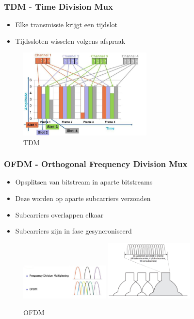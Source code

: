 \documentclass{article}
\begin{document}
\subsubsection{TDM - Time Division Mux}
\begin{itemize}
    \item Elke transmissie krijgt een tijdslot
    \item Tijdssloten wisselen volgens afspraak 
\end{itemize}

\begin{figure}[H]
    \centering
    \includegraphics[width=0.6\textwidth]{tdm.png} 
    \caption{TDM}
\end{figure}

\subsubsection{OFDM - Orthogonal Frequency Division Mux}
\begin{itemize}
    \item Opsplitsen van bitstream in aparte bitstreams
    \item Deze worden op aparte subcarriers verzonden
    \item Subcarriers overlappen elkaar
    \item Subcarriers zijn in fase gesyncroniseerd
\end{itemize}

\begin{figure}[H]
    \centering
    \includegraphics[width=0.4\textwidth]{ofdm.png} 
    \includegraphics[width=0.4\textwidth]{ofdm2.png} 
    \caption{OFDM}
\end{figure}
\end{document}
